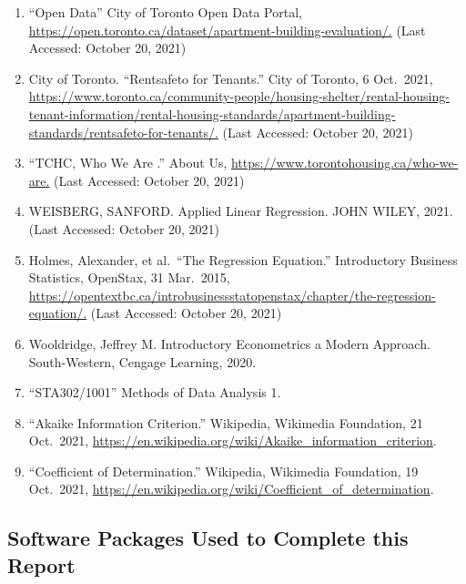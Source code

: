 \documentclass[
]{article}
\begin{document}
\begin{enumerate}
\def\labelenumi{\arabic{enumi}.}
\item
  ``Open Data'' City of Toronto Open Data Portal,
  \url{https://open.toronto.ca/dataset/apartment-building-evaluation/.}
  (Last Accessed: October 20, 2021)
\item
  City of Toronto. ``Rentsafeto for Tenants.'' City of Toronto, 6
  Oct.~2021,
  \url{https://www.toronto.ca/community-people/housing-shelter/rental-housing-tenant-information/rental-housing-standards/apartment-building-standards/rentsafeto-for-tenants/.}
  (Last Accessed: October 20, 2021)
\item
  ``TCHC, Who We Are .'' About Us,
  \url{https://www.torontohousing.ca/who-we-are.} (Last Accessed:
  October 20, 2021)
\item
  WEISBERG, SANFORD. Applied Linear Regression. JOHN WILEY, 2021. (Last
  Accessed: October 20, 2021)
\item
  Holmes, Alexander, et al.~``The Regression Equation.'' Introductory
  Business Statistics, OpenStax, 31 Mar.~2015,
  \url{https://opentextbc.ca/introbusinessstatopenstax/chapter/the-regression-equation/.}
  (Last Accessed: October 20, 2021)
\item
  Wooldridge, Jeffrey M. Introductory Econometrics a Modern Approach.
  South-Western, Cengage Learning, 2020.
\item
  ``STA302/1001'' Methods of Data Analysis 1.
\item
  ``Akaike Information Criterion.'' Wikipedia, Wikimedia Foundation, 21
  Oct.~2021,
  \url{https://en.wikipedia.org/wiki/Akaike_information_criterion}.
\item
  ``Coefficient of Determination.'' Wikipedia, Wikimedia Foundation, 19
  Oct.~2021,
  \url{https://en.wikipedia.org/wiki/Coefficient_of_determination}.
\end{enumerate}

\hypertarget{software-packages-used-to-complete-this-report}{%
\subsection{Software Packages Used to Complete this
Report}\label{software-packages-used-to-complete-this-report}}
\end{document}
